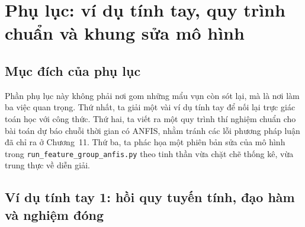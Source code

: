 \chapter{Phụ lục: ví dụ tính tay, quy trình chuẩn và khung sửa mô hình}

\section{Mục đích của phụ lục}

Phần phụ lục này không phải nơi gom những mẩu vụn còn sót lại, mà là nơi làm ba việc quan trọng. Thứ nhất, ta giải một vài ví dụ tính tay để nối lại trực giác toán học với công thức. Thứ hai, ta viết ra một quy trình thí nghiệm chuẩn cho bài toán dự báo chuỗi thời gian có ANFIS, nhằm tránh các lỗi phương pháp luận đã chỉ ra ở Chương~11. Thứ ba, ta phác họa một phiên bản sửa của mô hình trong \texttt{run\_feature\_group\_anfis.py} theo tinh thần vừa chặt chẽ thống kê, vừa trung thực về diễn giải.

\section{Ví dụ tính tay 1: hồi quy tuyến tính, đạo hàm và nghiệm đóng}

